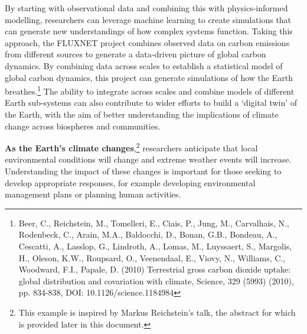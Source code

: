 {By starting with observational data and combining this with
physics-informed modelling, researchers can leverage machine learning to
create simulations that can generate new understandings of how complex
systems function. Taking this approach, the FLUXNET project combines
observed data on carbon emissions from different sources to generate a
data-driven picture of global carbon dynamics. By combining data across
scales to establish a statistical model of global carbon dynamics, this
project can generate simulations of how the Earth breathes.\footnote{Beer,
  C., Reichstein, M., Tomelleri, E., Ciais, P., Jung, M., Carvalhais,
  N., Rodenbeck, C., Arain, M.A., Baldocchi, D., Bonan, G.B., Bondeau,
  A., Cescatti, A., Lasslop, G., Lindroth, A., Lomas, M., Luyssaert, S.,
  Margolis, H., Oleson, K.W., Roupsard, O., Veenendaal, E., Viovy, N.,
  Williams, C., Woodward, F.I., Papale, D. (2010) Terrestrial gross
  carbon dioxide uptake: global distribution and covariation with
  climate, Science, 329 (5993) (2010), pp. 834-838, DOI:
  10.1126/science.1184984} The ability to integrate across scales and
combine models of different Earth sub-systems can also contribute to
wider efforts to build a `digital twin' of the Earth, with the aim of
better understanding the implications of climate change across
biospheres and communities.

\textbf{As the Earth's climate changes},\footnote{This example is
  inspired by Markus Reichstein's talk, the abstract for which is
  provided later in this document.} researchers anticipate that local
environmental conditions will change and extreme weather events will
increase. Understanding the impact of these changes is important for
those seeking to develop appropriate responses, for example developing
environmental management plans or planning human activities.

}
